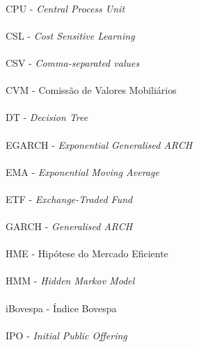 \paragraph{}CPU - \textit{Central Process Unit}
\paragraph{}CSL - \textit{Cost Sensitive Learning}
\paragraph{}CSV - \textit{Comma-separated values}
\paragraph{}CVM - Comissão de Valores Mobiliários
\paragraph{}DT - \textit{Decision Tree}
\paragraph{}EGARCH - \textit{Exponential Generalised ARCH}
\paragraph{}EMA - \textit{Exponential Moving Average}
\paragraph{}ETF - \textit{Exchange-Traded Fund}
\paragraph{}GARCH - \textit{Generalised ARCH}
\paragraph{}HME - Hipótese do Mercado Eficiente
\paragraph{}HMM - \textit{Hidden Markov Model}
\paragraph{}iBovespa - Índice Bovespa
\paragraph{}IPO - \textit{Initial Public Offering}
